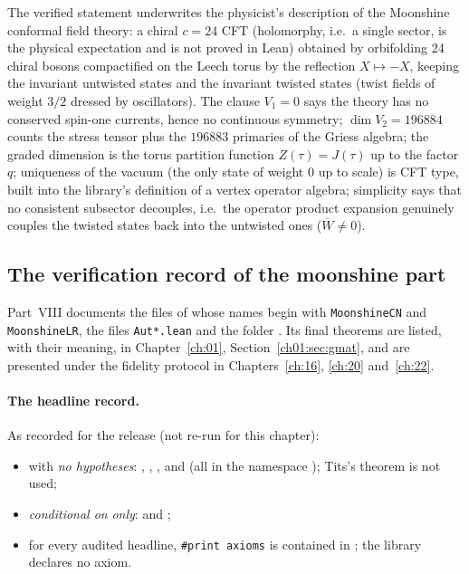 \begin{physics}
The verified statement underwrites the physicist's description of the Moonshine conformal field
theory: a chiral $c=24$ CFT (holomorphy, i.e.\ a single sector, is the physical expectation and is
not proved in Lean) obtained by orbifolding 24 chiral bosons
compactified on the Leech torus by the reflection $X\mapsto -X$, keeping the invariant untwisted
states and the invariant twisted states (twist fields of weight $3/2$ dressed by oscillators). The
clause $V_1=0$ says the theory has no conserved spin-one currents, hence no continuous symmetry;
$\dim V_2=196884$ counts the stress tensor plus the $196883$ primaries of the Griess algebra; the
graded dimension is the torus partition function $Z(\tau)=J(\tau)$ up to the factor $q$; uniqueness of
the vacuum (the only state of weight $0$ up to scale) is CFT type, built into the library's definition
of a vertex operator algebra; simplicity says that no consistent subsector decouples, i.e.\ the operator product expansion genuinely couples the twisted states
back into the untwisted ones ($\overline W\neq 0$).
\end{physics}

\subsection{The verification record of the moonshine part}\label{ch15:sec:moonrecord}

Part~VIII documents the files of  whose names begin with \texttt{MoonshineCN} and \texttt{MoonshineLR}, the files \texttt{Aut*.lean} and the folder
. Its final theorems are listed, with their meaning, in Chapter~\ref{ch:01},
Section~\ref{ch01:sec:gmat}, and are presented under the fidelity protocol in Chapters~\ref{ch:16}, \ref{ch:20}
and~\ref{ch:22}.

\paragraph{The headline record.} As recorded for the release (not
re-run for this chapter):
\begin{itemize}
\item with \emph{no hypotheses}: ,
  , ,  and
   (all in the namespace ); Tits's theorem is
  not used;
\item \emph{conditional on}  \emph{only}:  and ;
\item for every audited headline, \texttt{\#print axioms} is contained in ;
  the library declares no axiom.
\end{itemize}

